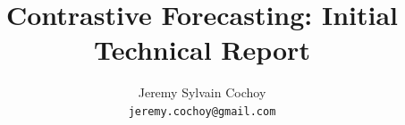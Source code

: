 \documentclass{article}
\title{Contrastive Forecasting: Initial Technical Report}
\author{%
  Jeremy Sylvain Cochoy \\
  \texttt{jeremy.cochoy@gmail.com}
}
\begin{document}
\maketitle




























\FloatBarrier








\end{document}
